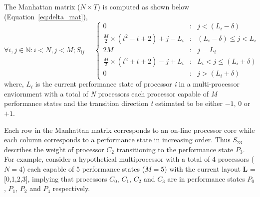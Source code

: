 The Manhattan matrix ($N \times T$) is computed as shown below (Equation~\eqref{eq:delta_mat}),
\begin{equation}
    \forall i,j \in \mathbb{N} : i < N, j < M; S_{ij} = \left\{
     \begin{array}{lcr}
       0 & : & j < (L_{i} - \delta) \\
       \frac{M}{2} \times (t^{2} - t + 2) + j - L_{i} & : & (L_{i} - \delta) \leq j < L_{i} \\
       2M & : & j = L_{i}\\
       \frac{M}{2} \times (t^{2} + t + 2) - j + L_{i} & : & L_{i} < j \leq (L_{i} + \delta) \\
       0 & : & j > (L_{i} + \delta)
     \end{array}
   \right.
\label{eq:delta_mat}
\end{equation}
where, $L_i$ is the current performance state of processor \textit{i} in a multi-processor enviornment 
with a total of \textit{N} processors each processor capable of \textit{M} performance states 
and the transition direction \textit{t} estimated to be either $-1$, $0$ or $+1$. 

Each row in the Manhattan matrix corresponds to an on-line processor core while each column corresponds to a performance state
in increasing order. Thus $S_{23}$ describes the weight of processor $C_2$ transitioning to the performance state $P_3$. 
For example, consider a hypothetical multiprocessor with a total of 4 processors ($N = 4$) each capable of
5 performance states ($M = 5$) with the current layout \textbf{L} = [0,1,2,3], implying that processors $C_0$, $C_1$, $C_2$ and $C_3$
are in performance states $P_0$, $P_1$, $P_2$ and $P_4$ respectively. 

